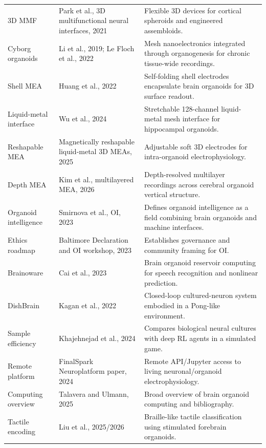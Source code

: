\documentclass[10pt,twocolumn]{article}
\begin{document}
\begin{table}[t]
\begin{tabularx}{\textwidth}{p{}p{}X}
3D MMF & Park et al., 3D multifunctional neural interfaces, 2021 \cite{park2021} & Flexible 3D devices for cortical spheroids and engineered assembloids. \\
Cyborg organoids & Li et al., 2019; Le Floch et al., 2022 \cite{li2019,lefloch2022} & Mesh nanoelectronics integrated through organogenesis for chronic tissue-wide recordings. \\
Shell MEA & Huang et al., 2022 \cite{huang2022} & Self-folding shell electrodes encapsulate brain organoids for 3D surface readout. \\
Liquid-metal interface & Wu et al., 2024 \cite{wu2024} & Stretchable 128-channel liquid-metal mesh interface for hippocampal organoids. \\
Reshapable MEA & Magnetically reshapable liquid-metal 3D MEAs, 2025 \cite{magnetic2025} & Adjustable soft 3D electrodes for intra-organoid electrophysiology. \\
Depth MEA & Kim et al., multilayered MEA, 2026 \cite{kim2026} & Depth-resolved multilayer recordings across cerebral organoid vertical structure. \\
\midrule
Organoid intelligence & Smirnova et al., OI, 2023 \cite{smirnova2023} & Defines organoid intelligence as a field combining brain organoids and machine interfaces. \\
Ethics roadmap & Baltimore Declaration and OI workshop, 2023 \cite{baltimore2023,workshop2023} & Establishes governance and community framing for OI. \\
Brainoware & Cai et al., 2023 \cite{cai2023} & Brain organoid reservoir computing for speech recognition and nonlinear prediction. \\
DishBrain & Kagan et al., 2022 \cite{kagan2022} & Closed-loop cultured-neuron system embodied in a Pong-like environment. \\
Sample efficiency & Khajehnejad et al., 2024 \cite{khajehnejad2024} & Compares biological neural cultures with deep RL agents in a simulated game. \\
Remote platform & FinalSpark Neuroplatform paper, 2024 \cite{finalspark2024} & Remote API/Jupyter access to living neuronal/organoid electrophysiology. \\
Computing overview & Talavera and Ulmann, 2025 \cite{talavera2025} & Broad overview of brain organoid computing and bibliography. \\
Tactile encoding & Liu et al., 2025/2026 \cite{liu2025} & Braille-like tactile classification using stimulated forebrain organoids. \\
\bottomrule
\end{tabularx}
\end{table}
\end{document}
